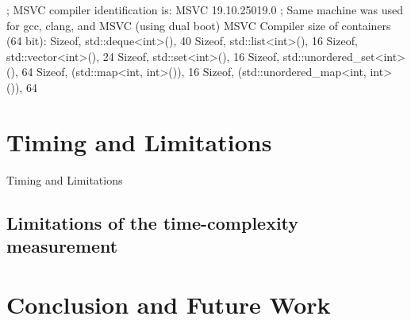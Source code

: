 \documentclass{sig-alternate}
\begin{document}
; MSVC compiler identification is:  MSVC 19.10.25019.0
; Same machine was used for gcc, clang, and MSVC (using dual boot)
MSVC Compiler size of containers (64 bit):
Sizeof, std::deque<int>(), 40
Sizeof, std::list<int>(), 16
Sizeof, std::vector<int>(), 24
Sizeof, std::set<int>(), 16
Sizeof, std::unordered_set<int>(), 64
Sizeof, (std::map<int, int>()), 16
Sizeof, (std::unordered_map<int, int>()), 64

\section{Timing and Limitations}
Timing and Limitations
\subsection{Limitations of the time-complexity measurement}

\section{Conclusion and Future Work}


{\small

}
\end{document}
